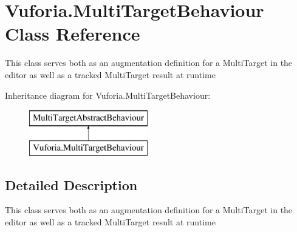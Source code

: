 \hypertarget{class_vuforia_1_1_multi_target_behaviour}{}\section{Vuforia.\+Multi\+Target\+Behaviour Class Reference}
\label{class_vuforia_1_1_multi_target_behaviour}


This class serves both as an augmentation definition for a Multi\+Target in the editor as well as a tracked Multi\+Target result at runtime  


Inheritance diagram for Vuforia.\+Multi\+Target\+Behaviour\+:\begin{figure}[H]
\begin{center}
\leavevmode
\includegraphics[height=2.000000cm]{class_vuforia_1_1_multi_target_behaviour}
\end{center}
\end{figure}


\subsection{Detailed Description}
This class serves both as an augmentation definition for a Multi\+Target in the editor as well as a tracked Multi\+Target result at runtime 

